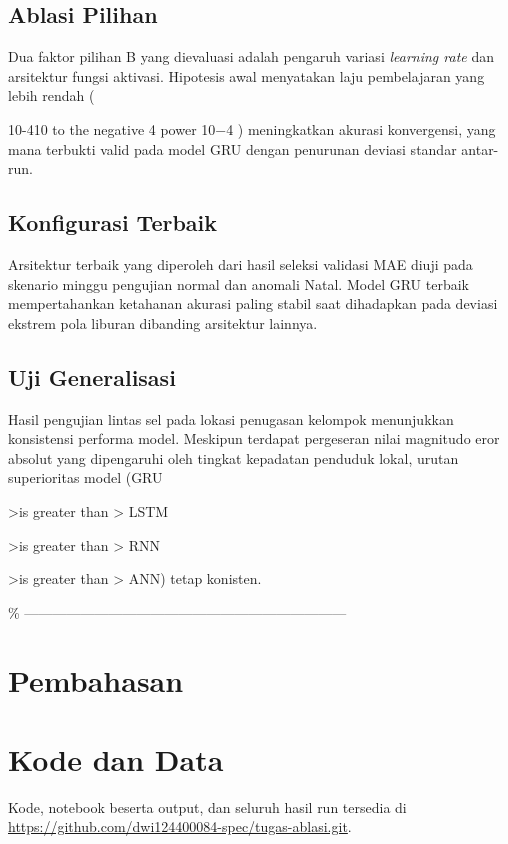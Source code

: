 \documentclass[conference,a4paper]{IEEEtran}
\begin{document}
\subsection{Ablasi Pilihan} Dua faktor pilihan B yang dievaluasi adalah pengaruh variasi \textit{learning rate} dan arsitektur fungsi aktivasi. Hipotesis awal menyatakan laju pembelajaran yang lebih rendah (

10-410 to the negative 4 power
10−4
) meningkatkan akurasi konvergensi, yang mana terbukti valid pada model GRU dengan penurunan deviasi standar antar-run. 

\subsection{Konfigurasi Terbaik}
Arsitektur terbaik yang diperoleh dari hasil seleksi validasi MAE diuji pada skenario minggu pengujian normal dan anomali Natal. Model GRU terbaik mempertahankan ketahanan akurasi paling stabil saat dihadapkan pada deviasi ekstrem pola liburan dibanding arsitektur lainnya. 

\subsection{Uji Generalisasi}
Hasil pengujian lintas sel pada lokasi penugasan kelompok menunjukkan konsistensi performa model. Meskipun terdapat pergeseran nilai magnitudo eror absolut yang dipengaruhi oleh tingkat kepadatan penduduk lokal, urutan superioritas model (GRU 

>is greater than
>
 LSTM 

>is greater than
>
 RNN 

>is greater than
>
 ANN) tetap konisten. 

\% --------------------------------------------------------------------- \section{Pembahasan}

\section*{Kode dan Data}
Kode, notebook beserta output, dan seluruh hasil run tersedia di \url{https://github.com/dwi124400084-spec/tugas-ablasi.git}.
\end{document}
